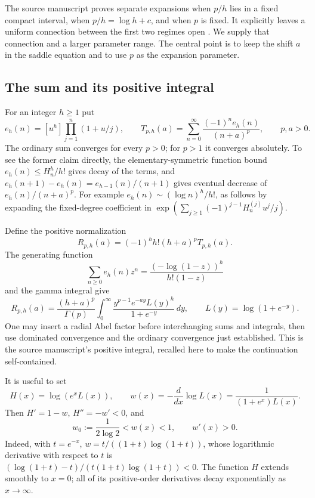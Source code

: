 \documentclass[11pt,letterpaper]{article}
\numberwithin{equation}{section}
\theoremstyle{plain}
\theoremstyle{definition}
\theoremstyle{remark}
\begin{document}
The source manuscript proves separate expansions when $p/h$ lies in a
fixed compact interval, when $p/h=\log h+c$, and when $p$ is fixed.
It explicitly leaves a uniform connection between the first two regimes
open \cite{ProveIt}. We supply that connection and a larger parameter
range. The central point is to keep the shift $a$ in the saddle equation
and to use $p$ as the expansion parameter.

\subsection{The sum and its positive integral}
For an integer $h\geq1$ put
\[
 e_h(n)=[u^h]\prod_{j=1}^n(1+u/j),\qquad
 T_{p,h}(a)=\sum_{n=0}^{\infty}\frac{(-1)^n e_h(n)}{(n+a)^p},
 \qquad p,a>0.
\]
The ordinary sum converges for every $p>0$; for $p>1$ it converges
absolutely. To see the former claim directly, the elementary-symmetric
function bound $e_h(n)\leq H_n^h/h!$ gives decay of the terms, and
$e_h(n+1)-e_h(n)=e_{h-1}(n)/(n+1)$ gives eventual decrease of
$e_h(n)/(n+a)^p$. For example $e_h(n)\sim(\log n)^h/h!$, as follows
by expanding the fixed-degree coefficient in
$\exp(\sum_{j\geq1}(-1)^{j-1}H_n^{(j)}u^j/j)$.

Define the positive normalization
\begin{equation}\label{cont26:eq:R}
 R_{p,h}(a)=(-1)^h h!(h+a)^pT_{p,h}(a).
\end{equation}
The generating function
\[
 \sum_{n\geq0}e_h(n)z^n
 =\frac{(-\log(1-z))^h}{h!(1-z)}
\]
and the gamma integral give
\begin{equation}\label{cont26:eq:positive}
 R_{p,h}(a)=\frac{(h+a)^p}{\Gamma(p)}
 \int_0^{\infty}\frac{y^{p-1}e^{-ay}L(y)^h}{1+e^{-y}}\,dy,
 \qquad L(y)=\log(1+e^{-y}).
\end{equation}
One may insert a radial Abel factor before interchanging sums and
integrals, then use dominated convergence and the ordinary convergence
just established. This is the source manuscript's positive integral,
recalled here to make the continuation self-contained.

It is useful to set
\begin{equation}\label{cont26:eq:H-w}
 H(x)=\log(e^xL(x)),\qquad
 w(x)=-\frac{d}{dx}\log L(x)
 =\frac1{(1+e^x)L(x)}.
\end{equation}
Then $H'=1-w$, $H''=-w'<0$, and
\begin{equation}\label{cont26:eq:w-bound}
 w_0:=\frac1{2\log2}<w(x)<1,\qquad w'(x)>0.
\end{equation}
Indeed, with $t=e^{-x}$,
$w=t/((1+t)\log(1+t))$, whose logarithmic derivative with respect
to $t$ is $(\log(1+t)-t)/(t(1+t)\log(1+t))<0$.
The function $H$ extends smoothly to $x=0$; all of its positive-order
derivatives decay exponentially as $x\to\infty$.
\end{document}
